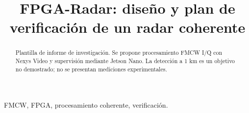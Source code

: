 \documentclass[conference]{IEEEtran}
\title{FPGA-Radar: diseño y plan de verificación de un radar coherente}
\author{\IEEEauthorblockN{Autoría pendiente de completar}}
\begin{document}
\maketitle
\begin{abstract}
Plantilla de informe de investigación. Se propone procesamiento FMCW I/Q
con Nexys Video y supervisión mediante Jetson Nano. La detección a 1 km
es un objetivo no demostrado; no se presentan mediciones experimentales.
\end{abstract}
\begin{IEEEkeywords}
FMCW, FPGA, procesamiento coherente, verificación.
\end{IEEEkeywords}




% 
% 
\end{document}

